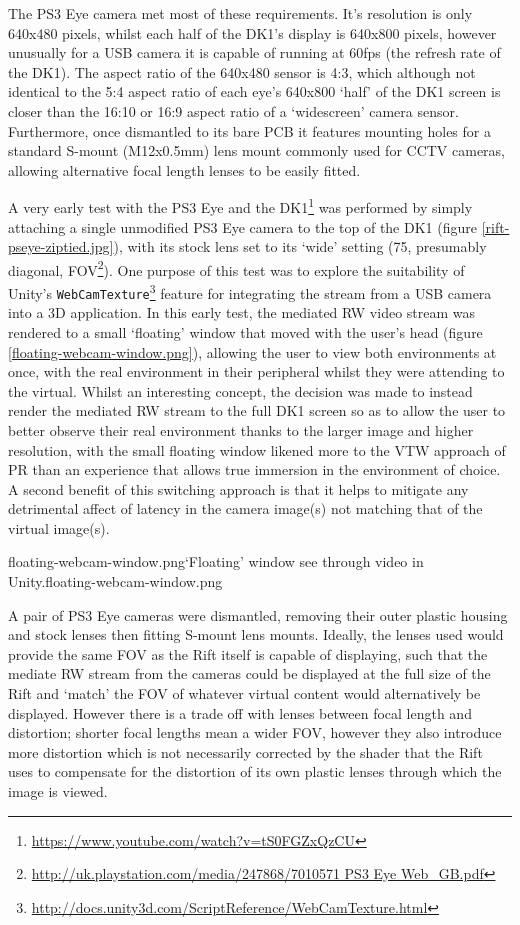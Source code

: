 The PS3 Eye camera met most of these requirements. It's resolution is only 640x480 pixels, whilst each half of the DK1's display is 640x800 pixels, however unusually for a USB camera it is capable of running at 60fps (the refresh rate of the DK1). The aspect ratio of the 640x480 sensor is 4:3, which although not identical to the 5:4 aspect ratio of each eye's 640x800 `half' of the DK1 screen is closer than the 16:10 or 16:9 aspect ratio of a `widescreen' camera sensor. Furthermore, once dismantled to its bare PCB it features mounting holes for a standard S-mount (M12x0.5mm) lens mount commonly used for CCTV cameras, allowing alternative focal length lenses to be easily fitted.

A very early test with the PS3 Eye and the DK1\footnote{\url{https://www.youtube.com/watch?v=tS0FGZxQzCU}} was performed by simply attaching a single unmodified PS3 Eye camera to the top of the DK1 (figure \ref{rift-pseye-ziptied.jpg}), with its stock lens set to its `wide' setting (75\textdegree, presumably diagonal, FOV\footnote{\url{http://uk.playstation.com/media/247868/7010571 PS3 Eye Web_GB.pdf}}). One purpose of this test was to explore the suitability of Unity's \texttt{WebCamTexture}\footnote{\url{http://docs.unity3d.com/ScriptReference/WebCamTexture.html}} feature for integrating the stream from a USB camera into a 3D application. In this early test, the mediated RW video stream was rendered to a small `floating' window that moved with the user's head (figure \ref{floating-webcam-window.png}), allowing the user to view both environments at once, with the real environment in their peripheral whilst they were attending to the virtual. Whilst an interesting concept, the decision was made to instead render the mediated RW stream to the full DK1 screen so as to allow the user to better observe their real environment thanks to the larger image and higher resolution, with the small floating window likened more to the VTW approach of PR than an experience that allows true immersion in the environment of choice. A second benefit of this switching approach is that it helps to mitigate any detrimental affect of latency in the camera image(s) not matching that of the virtual image(s).

       {floating-webcam-window.png}{`Floating' window see through video in Unity.}{floating-webcam-window.png}

A pair of PS3 Eye cameras were dismantled, removing their outer plastic housing and stock lenses then fitting S-mount lens mounts. Ideally, the lenses used would provide the same FOV as the Rift itself is capable of displaying, such that the mediate RW stream from the cameras could be displayed at the full size of the Rift and `match' the FOV of whatever virtual content would alternatively be displayed. However there is a trade off with lenses between focal length and distortion; shorter focal lengths mean a wider FOV, however they also introduce more distortion which is not necessarily corrected by the shader that the Rift uses to compensate for the distortion of its own plastic lenses through which the image is viewed.

